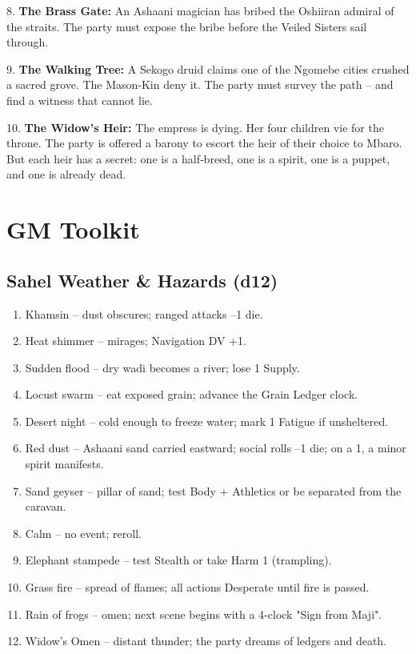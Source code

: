 \documentclass[11pt]{book}
\begin{document}
8. \textbf{The Brass Gate:} An Ashaani magician has bribed the Oshiiran admiral of the straits. The party must expose the bribe before the Veiled Sisters sail through.

9. \textbf{The Walking Tree:} A Sekogo druid claims one of the Ngomebe cities crushed a sacred grove. The Mason‑Kin deny it. The party must survey the path -- and find a witness that cannot lie.

10. \textbf{The Widow's Heir:} The empress is dying. Her four children vie for the throne. The party is offered a barony to escort the heir of their choice to Mbaro. But each heir has a secret: one is a half‑breed, one is a spirit, one is a puppet, and one is already dead.

\chapter{GM Toolkit}

\section{Sahel Weather \& Hazards (d12)}

\begin{enumerate}
\item Khamsin -- dust obscures; ranged attacks --1 die.
\item Heat shimmer -- mirages; Navigation DV +1.
\item Sudden flood -- dry wadi becomes a river; lose 1 Supply.
\item Locust swarm -- eat exposed grain; advance the Grain Ledger clock.
\item Desert night -- cold enough to freeze water; mark 1 Fatigue if unsheltered.
\item Red dust -- Ashaani sand carried eastward; social rolls --1 die; on a 1, a minor spirit manifests.
\item Sand geyser -- pillar of sand; test Body + Athletics or be separated from the caravan.
\item Calm -- no event; reroll.
\item Elephant stampede -- test Stealth or take Harm 1 (trampling).
\item Grass fire -- spread of flames; all actions Desperate until fire is passed.
\item Rain of frogs -- omen; next scene begins with a 4‑clock "Sign from Maji".
\item Widow's Omen -- distant thunder; the party dreams of ledgers and death.
\end{enumerate}
\end{document}
